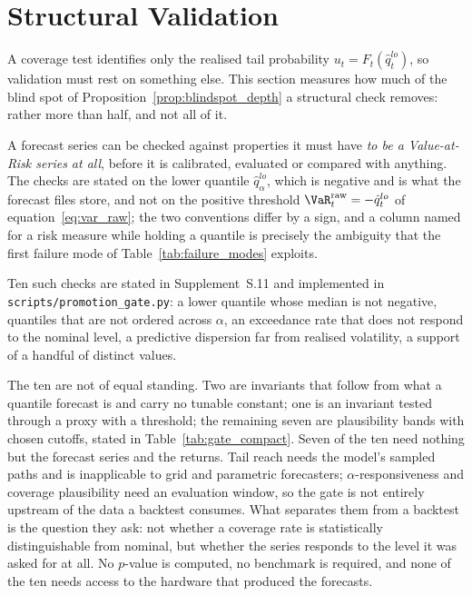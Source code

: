 \section{Structural Validation}
\label{sec:gate}

A coverage test identifies only the realised tail probability
$u_t = F_t(\hat q^{lo}_t)$, so validation must rest on something else. This
section measures how much of the blind spot of
Proposition~\ref{prop:blindspot_depth} a structural check removes: rather more
than half, and not all of it.

A forecast series can be checked against properties it must have \emph{to be a
Value-at-Risk series at all}, before it is calibrated, evaluated or compared with
anything. The checks are stated on the lower quantile $\hat q^{lo}_\alpha$, which
is negative and is what the forecast files store, and not on the positive
threshold $\VaR_t^{\mathrm{raw}} = -\hat q_t^{lo}$ of
equation~\eqref{eq:var_raw}; the two conventions differ by a sign, and a column
named for a risk measure while holding a quantile is precisely the ambiguity
that the first failure mode of Table~\ref{tab:failure_modes} exploits.

Ten such checks are stated in Supplement~S.11 and implemented in
\texttt{scripts/promotion\_gate.py}: a lower quantile whose median is not
negative, quantiles that are not ordered across $\alpha$, an exceedance rate that
does not respond to the nominal level, a predictive dispersion far from realised
volatility, a support of a handful of distinct values.

The ten are not of equal standing. Two are invariants that follow from what a
quantile forecast is and carry no tunable constant; one is an invariant tested
through a proxy with a threshold; the remaining seven are plausibility bands
with chosen cutoffs, stated in Table~\ref{tab:gate_compact}. Seven of the ten need nothing but the forecast
series and the returns. Tail reach needs the model's sampled paths and is
inapplicable to grid and parametric forecasters; $\alpha$-responsiveness and
coverage plausibility need an evaluation window, so the gate is not entirely
upstream of the data a backtest consumes. What separates them from a backtest is the
question they ask: not whether a coverage rate is statistically distinguishable
from nominal, but whether the series responds to the level it was asked for at
all. No $p$-value is computed, no benchmark is required, and none of the ten
needs access to the hardware that produced the forecasts.

